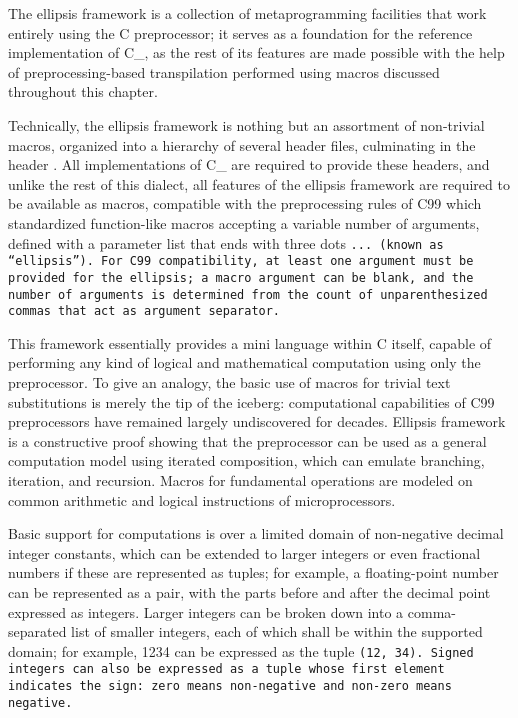 \def\Section#1{\section{#1}}

The ellipsis framework is a collection of metaprogramming
facilities that work entirely using the C preprocessor;
it serves as a foundation for the reference implementation of C\_, as
the rest of its features are made possible with the help of preprocessing-based
transpilation performed using macros discussed throughout this chapter.

Technically, the ellipsis framework is nothing but an assortment of
non-trivial macros, organized into a hierarchy of several header files,
culminating in the header .
All implementations of C\_ are required to provide these headers,
and unlike the rest of this dialect, all features of the ellipsis
framework are required to be available as macros, compatible with
the preprocessing rules of C99 which standardized function-like
macros accepting a variable number of arguments, defined with a
parameter list that ends with three dots \tt{...} (known as ``ellipsis'').
For C99 compatibility, at least one argument must be provided for the ellipsis;
a macro argument can be blank, and the number of arguments is determined
from the count of unparenthesized commas that act as argument separator.

This framework essentially provides a mini language within C itself,
capable of performing any kind of logical and
mathematical computation using only the preprocessor.
To give an analogy, the basic use of macros for trivial text substitutions
is merely the tip of the iceberg: computational capabilities of
C99 preprocessors have remained largely undiscovered for decades.
Ellipsis framework is a constructive proof showing that the preprocessor
can be used as a general computation model using iterated composition,
which can emulate branching, iteration, and recursion.
Macros for fundamental operations are modeled on common
arithmetic and logical instructions of microprocessors.

Basic support for computations is over a limited domain of non-negative
decimal integer constants, which can be extended to larger integers
or even fractional numbers if these are represented as tuples;
for example, a floating-point number can be represented as a pair,
with the parts before and after the decimal point expressed as integers.
Larger integers can be broken down into a comma-separated list of
smaller integers, each of which shall be within the supported domain;
for example, 1234 can be expressed as the tuple \tt{(12, 34)}.
Signed integers can also be expressed as a tuple whose first element
indicates the sign: zero means non-negative and non-zero means negative.

